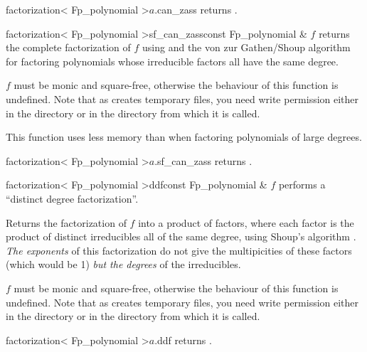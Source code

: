 \begin{cfcode}{factorization< Fp_polynomial >}{$a$.can_zass}{}
  returns .
\end{cfcode}

\begin{fcode}{factorization< Fp_polynomial >}{sf_can_zass}{const Fp_polynomial & $f$}
  returns the complete factorization of $f$ using  and the von zur Gathen/Shoup
  algorithm for factoring polynomials whose irreducible factors all have the same degree.
  
  $f$ must be monic and square-free, otherwise the behaviour of this function is undefined.
  Note that as  creates temporary files, you need write permission either in the
   directory or in the directory from which it is called.

  This function uses less memory than  when factoring polynomials of large
  degrees.
\end{fcode}

\begin{cfcode}{factorization< Fp_polynomial >}{$a$.sf_can_zass}{}
returns .
\end{cfcode}

\begin{fcode}{factorization< Fp_polynomial >}{ddf}{const Fp_polynomial & $f$}
  performs a ``distinct degree factorization''.

  Returns the factorization of $f$ into a product of factors, where each factor is the product
  of distinct irreducibles all of the same degree, using Shoup's algorithm \cite{Shoup:1995}.
  \emph{The exponents} of this factorization do not give the multipicities of these factors
  (which would be 1) \emph{but the degrees} of the
  irreducibles.

  $f$ must be monic and square-free, otherwise the behaviour of this function is undefined.
  Note that as  creates temporary files, you need write permission either in the
   directory or in the directory from which it is called.
\end{fcode}

\begin{cfcode}{factorization< Fp_polynomial >}{$a$.ddf}{}
  returns .
\end{cfcode}




